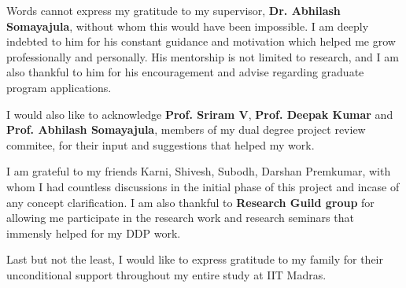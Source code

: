 \acknowledgements
Words cannot express my gratitude to my supervisor, {\bf Dr. Abhilash Somayajula}, 
without whom this would have been impossible. I am deeply indebted to him for 
his constant guidance and motivation which helped me grow professionally and 
personally. His mentorship is not limited to research, and I am also thankful 
to him for his encouragement and advise regarding graduate program applications.

I would also like to acknowledge {\bf Prof. Sriram V}, {\bf Prof. Deepak Kumar} and 
{\bf Prof. Abhilash Somayajula}, members of my dual degree project review commitee, for 
their input and suggestions that helped my work.

I am grateful to my friends Karni, Shivesh, Subodh, Darshan Premkumar, with whom I had countless
discussions in the initial phase of this project and incase of any concept clarification.
I am also thankful to {\bf Research Guild group} for allowing me participate in the research work
and research seminars that immensly helped for my DDP work.

Last but not the least, I would like to express gratitude to my family for 
their unconditional support throughout my entire study at IIT Madras.